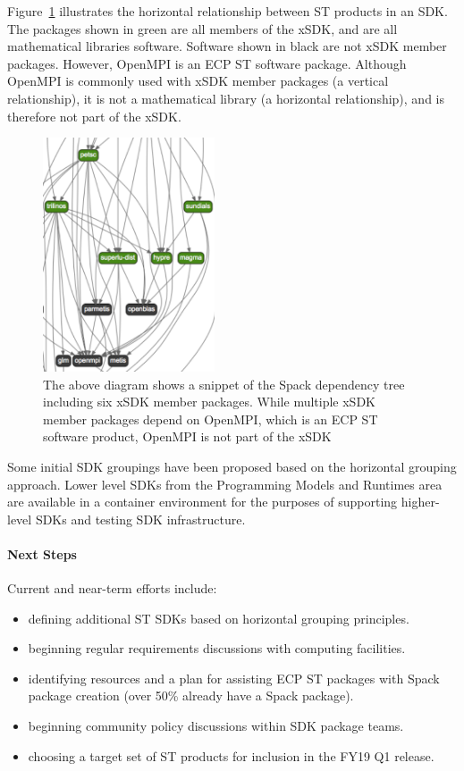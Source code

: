 Figure~\ref{fig:sdk-horizontal} illustrates the horizontal relationship between ST products in an SDK. The packages shown in green are all members of the xSDK, and are all mathematical libraries software. Software shown in black are not xSDK member packages. However, OpenMPI is an ECP ST software package. Although OpenMPI is commonly used with xSDK member packages (a vertical relationship), it is not a mathematical library (a horizontal relationship), and is therefore not part of the xSDK.
\begin{figure}[htb]
        \centering
        \includegraphics[width=2in]{projects/2.3.5-Ecosystem/2.3.5.01-Ecosystem-SDK/SDKfig}
        \caption{\label{fig:sdk-horizontal}The above diagram shows a snippet of the Spack dependency tree including six xSDK member packages. While multiple xSDK member packages depend on OpenMPI, which is an ECP ST software product, OpenMPI is not part of the xSDK}
\end{figure}


Some initial SDK groupings have been proposed based on the horizontal grouping approach. Lower level SDKs from the Programming Models and Runtimes area are available in a container environment for the purposes of supporting higher-level SDKs and testing SDK infrastructure.

\paragraph{Next Steps}
Current and near-term efforts include:

\begin{itemize}
\item  defining additional ST SDKs based on horizontal grouping principles.
\item  beginning regular requirements discussions with computing facilities.
\item  identifying resources and a plan for assisting ECP ST packages with Spack package creation (over 50\% already have a Spack package).
\item  beginning community policy discussions within SDK package teams.
\item  choosing a target set of ST products for inclusion in the FY19 Q1 release.
\end{itemize}

